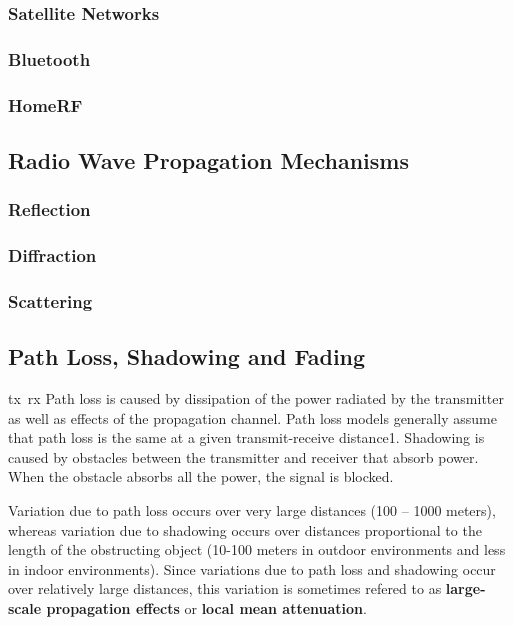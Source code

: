 \subsubsection{Satellite Networks}
\subsubsection{Bluetooth}
\subsubsection{HomeRF}





\subsection{Radio Wave Propagation Mechanisms}
\subsubsection{Reflection}
\subsubsection{Diffraction}
\subsubsection{Scattering}



\subsection{Path Loss, Shadowing and Fading}
\gls{tx}~\gls{rx}
Path loss is caused by dissipation of the power radiated by the transmitter as well as effects of the propagation channel.
Path loss models generally assume that path loss is the same at a given transmit-receive distance1.
Shadowing is caused by obstacles between the transmitter and receiver that absorb power.
When the obstacle absorbs all the power, the signal is blocked.

Variation due to path loss occurs over very large distances (100 -- 1000 meters), whereas variation due to shadowing occurs over distances proportional to the length of the obstructing object (10-100 meters in outdoor environments and less in indoor environments).
Since variations due to path loss and shadowing occur over relatively large distances, this variation is sometimes refered to as \textbf{large-scale propagation effects} or \textbf{local mean attenuation}.

\pagebreak
